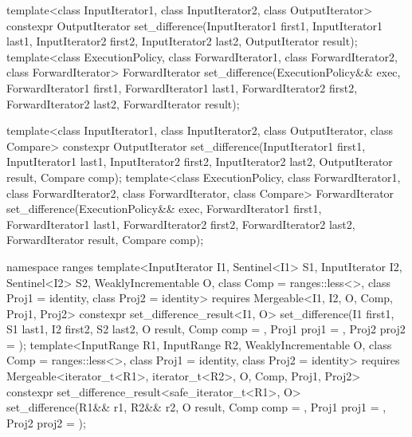 %
\begin{itemdecl}
template<class InputIterator1, class InputIterator2,
         class OutputIterator>
  constexpr OutputIterator
    set_difference(InputIterator1 first1, InputIterator1 last1,
                   InputIterator2 first2, InputIterator2 last2,
                   OutputIterator result);
template<class ExecutionPolicy, class ForwardIterator1, class ForwardIterator2,
         class ForwardIterator>
  ForwardIterator
    set_difference(ExecutionPolicy&& exec,
                   ForwardIterator1 first1, ForwardIterator1 last1,
                   ForwardIterator2 first2, ForwardIterator2 last2,
                   ForwardIterator result);

template<class InputIterator1, class InputIterator2,
         class OutputIterator, class Compare>
  constexpr OutputIterator
    set_difference(InputIterator1 first1, InputIterator1 last1,
                   InputIterator2 first2, InputIterator2 last2,
                   OutputIterator result, Compare comp);
template<class ExecutionPolicy, class ForwardIterator1, class ForwardIterator2,
         class ForwardIterator, class Compare>
  ForwardIterator
    set_difference(ExecutionPolicy&& exec,
                   ForwardIterator1 first1, ForwardIterator1 last1,
                   ForwardIterator2 first2, ForwardIterator2 last2,
                   ForwardIterator result, Compare comp);

namespace ranges {
  template<InputIterator I1, Sentinel<I1> S1, InputIterator I2, Sentinel<I2> S2,
      WeaklyIncrementable O, class Comp = ranges::less<>, class Proj1 = identity, class Proj2 = identity>
    requires Mergeable<I1, I2, O, Comp, Proj1, Proj2>
    constexpr set_difference_result<I1, O>
      set_difference(I1 first1, S1 last1, I2 first2, S2 last2, O result,
                     Comp comp = {}, Proj1 proj1 = {}, Proj2 proj2 = {});
  template<InputRange R1, InputRange R2, WeaklyIncrementable O,
      class Comp = ranges::less<>, class Proj1 = identity, class Proj2 = identity>
    requires Mergeable<iterator_t<R1>, iterator_t<R2>, O, Comp, Proj1, Proj2>
    constexpr set_difference_result<safe_iterator_t<R1>, O>
      set_difference(R1&& r1, R2&& r2, O result,
                     Comp comp = {}, Proj1 proj1 = {}, Proj2 proj2 = {});
}
\end{itemdecl}

